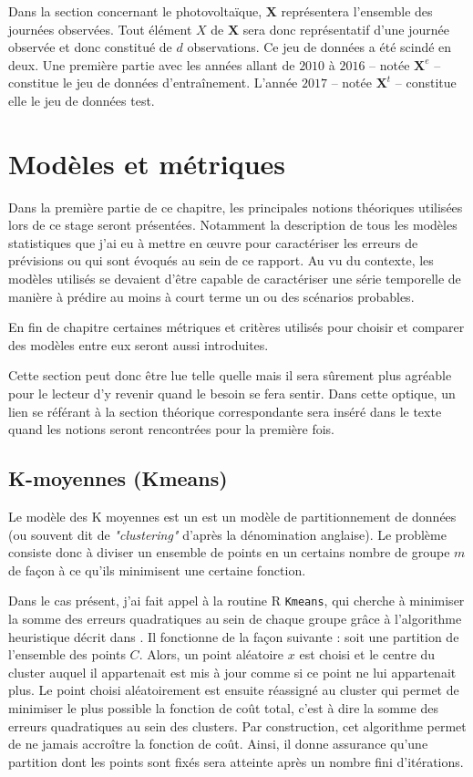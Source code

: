 \documentclass[12pt, french]{report}
\begin{document}
\newpage
Dans la section concernant le photovoltaïque, $\bm{X}$ représentera l'ensemble des journées observées. Tout élément $X$ de $\bm{X}$ sera donc représentatif d'une journée observée et donc constitué de $d$ observations. Ce jeu de données a été scindé en deux. Une première partie avec les années allant de $2010$ à $2016$ -- notée $\bm{X}^e$ -- constitue le jeu de données d'entraînement. L'année $2017$ -- notée $\bm{X}^t$ -- constitue elle le jeu de données test.  


\pagestyle{corpus}
\chapter{Modèles et métriques}
Dans la première partie de ce chapitre, les principales notions théoriques utilisées lors de ce stage seront présentées. Notamment la description de tous les modèles statistiques que j'ai eu à mettre en œuvre pour caractériser les erreurs de prévisions ou qui sont évoqués au sein de ce rapport. Au vu du contexte, les modèles utilisés se devaient d'être capable de caractériser une série temporelle de manière à prédire au moins à court terme un ou des scénarios probables.

En fin de chapitre certaines métriques et critères utilisés pour choisir et comparer des modèles entre eux seront aussi introduites.

Cette section peut donc être lue telle quelle mais il sera sûrement plus agréable pour le lecteur d'y revenir quand le besoin se fera sentir. Dans cette optique, un lien se référant à la section théorique correspondante sera inséré dans le texte quand les notions seront rencontrées pour la première fois.

\section{K-moyennes (Kmeans)}
\label{sec:Kmeans}

Le modèle des K moyennes est un est un modèle de partitionnement de données (ou souvent dit de \textit{"clustering"} d'après la dénomination anglaise). Le problème consiste donc à diviser un ensemble de points en un certains nombre de groupe $m$ de façon à ce qu'ils minimisent une certaine fonction.


Dans le cas présent, j'ai fait appel à la routine R \texttt{Kmeans}, qui cherche à minimiser la somme des erreurs quadratiques au sein de chaque groupe grâce à l'algorithme heuristique décrit dans \cite{hartigan_algorithm_1979}. Il fonctionne de la façon suivante : soit une partition de l'ensemble des points $C$. Alors, un point aléatoire $x$ est choisi et le centre du cluster auquel il appartenait est mis à jour comme si ce point ne lui appartenait plus. Le point choisi aléatoirement est ensuite réassigné au cluster qui permet de minimiser le plus possible la fonction de coût total, c'est à dire la somme des erreurs quadratiques au sein des clusters. Par construction, cet algorithme permet de ne jamais accroître la fonction de coût. Ainsi, il donne assurance qu'une partition dont les points sont fixés sera atteinte après un nombre fini d'itérations.
\end{document}
